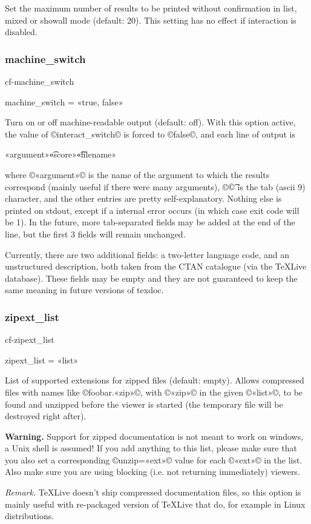 \documentclass[a4paper, oneside]{scrartcl}
\makeatletter
\newcommand\texlive{%
  \TeX\thinspace Live\xspace}
\newif\ifframed
\newenvironment{cmdsubsub}[2]{%
  \framedfalse \commandes\subsubsection{#1}{#2}%
  }{%
  \endcommandes}
\newenvironment{htcode}{%
  \SaveVerbatim[samepage, gobble=2]{verbmat}%
  }{%
  \endSaveVerbatim
  \par\medskip\noindent\hspace*{\parindent}%
  \BUseVerbatim{verbmat}%
  \par\medskip\@endpetrue}
\makeatother
\begin{document}
Set the maximum number of results to be printed without confirmation in list,
mixed or showall mode (default: 20). This setting has no effect if interaction
is disabled.

\begin{cmdsubsub}{machine_switch}{cf-machine_switch}
  machine_switch = «true, false»
\end{cmdsubsub}

Turn on or off machine-readable output (default: off).  With this option
active, the value of ©interact_switch© is forced to ©false©, and each line of
output is
\begin{htcode}
  «argument»\t«score»\t«filename»
\end{htcode}
where ©«argument»© is the name of the argument to which the results correspond
(mainly useful if there were many arguments), ©\t© is the tab (ascii 9)
character, and the other entries are pretty self-explanatory. Nothing else is
printed on stdout, except if a internal error occurs (in which case exit code
will be 1). In the future, more tab-separated fields may be added at the end
of the line, but the first 3 fields will remain unchanged.

Currently, there are two additional fields: a two-letter language code, and an
unstructured description, both taken from the CTAN catalogue (via the \texlive
database). These fields may be empty and they are not guaranteed to keep the
same meaning in future versions of texdoc.

\begin{cmdsubsub}{zipext_list}{cf-zipext_list}
  zipext_list = «list»
\end{cmdsubsub}

List of supported extensions for zipped files (default: empty).  Allows
compressed files with names like ©foobar.«zip»©, with ©«zip»© in the given
©«list»©, to be found and unzipped before the viewer is started (the
temporary file will be destroyed right after).

\textbf{Warning.} Support for zipped documentation is not meant to work on
windows, a Unix shell is assumed! If you add anything to this list, please
make sure that you also set a corresponding ©unzip=«ext»© value for each
©«ext»© in the list. Also make sure you are using blocking (i.e. not returning
immediately) viewers.

\textit{Remark.} \texlive doesn't ship compressed documentation files, so
this option is mainly useful with re-packaged version of \texlive that do,
for example in Linux distributions.
\end{document}
